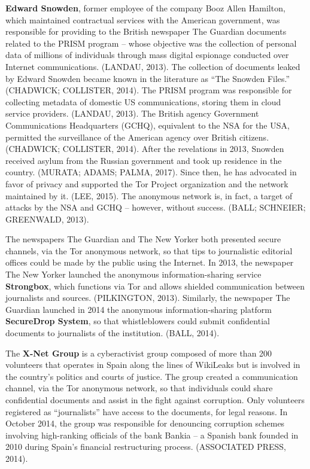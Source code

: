 \textbf{Edward Snowden}, former employee of the company Booz Allen Hamilton, which maintained contractual services with the American government, was responsible for providing to the British newspaper The Guardian documents related to the PRISM program -- whose objective was the collection of personal data of millions of individuals through mass digital espionage conducted over Internet communications. (LANDAU, 2013). The collection of documents leaked by Edward Snowden became known in the literature as ``The Snowden Files.'' (CHADWICK; COLLISTER, 2014). The PRISM program was responsible for collecting metadata of domestic US communications, storing them in cloud service providers. (LANDAU, 2013). The British agency Government Communications Headquarters (GCHQ), equivalent to the NSA for the USA, permitted the surveillance of the American agency over British citizens. (CHADWICK; COLLISTER, 2014). After the revelations in 2013, Snowden received asylum from the Russian government and took up residence in the country. (MURATA; ADAMS; PALMA, 2017). Since then, he has advocated in favor of privacy and supported the Tor Project organization and the network maintained by it. (LEE, 2015). The anonymous network is, in fact, a target of attacks by the NSA and GCHQ -- however, without success. (BALL; SCHNEIER; GREENWALD, 2013).

The newspapers The Guardian and The New Yorker both presented secure channels, via the Tor anonymous network, so that tips to journalistic editorial offices could be made by the public using the Internet. In 2013, the newspaper The New Yorker launched the anonymous information-sharing service \textbf{Strongbox}, which functions via Tor and allows shielded communication between journalists and sources. (PILKINGTON, 2013). Similarly, the newspaper The Guardian launched in 2014 the anonymous information-sharing platform \textbf{SecureDrop System}, so that whistleblowers could submit confidential documents to journalists of the institution. (BALL, 2014).

The \textbf{X-Net Group} is a cyberactivist group composed of more than 200 volunteers that operates in Spain along the lines of WikiLeaks but is involved in the country's politics and courts of justice. The group created a communication channel, via the Tor anonymous network, so that individuals could share confidential documents and assist in the fight against corruption. Only volunteers registered as ``journalists'' have access to the documents, for legal reasons. In October 2014, the group was responsible for denouncing corruption schemes involving high-ranking officials of the bank Bankia -- a Spanish bank founded in 2010 during Spain's financial restructuring process. (ASSOCIATED PRESS, 2014).

